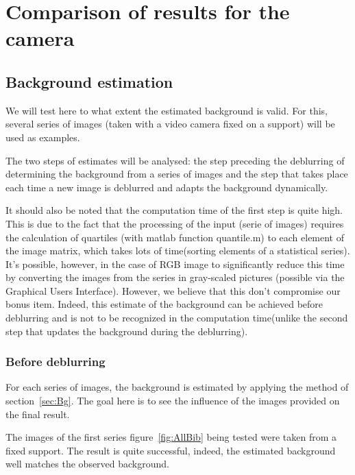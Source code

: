 \section{Comparison of results for the camera}

\subsection{Background estimation}

We will test here to what extent the estimated background is valid. For this, several series of images (taken with a video camera fixed on a support) will be used as examples.

The two steps of estimates will be analysed: the step preceding the deblurring of determining the background from a series of images and the step that takes place each time a new image is deblurred and adapts the background dynamically.

It should also be noted that the computation time of the first step is quite high. This is due to the fact that the processing of the input (serie of images) requires the calculation of quartiles (with matlab  function quantile.m) to each element of the image matrix, which takes lots of time(sorting elements of a statistical series). It's possible, however, in the case of RGB image to significantly reduce this time by converting the images from the series in gray-scaled pictures (possible via the Graphical Users Interface).
However, we believe that this don't compromise our bonus item. Indeed, this estimate of the background can be achieved before deblurring and is not to be recognized in the computation time(unlike the second step that updates the background during the deblurring).

\subsubsection{Before deblurring}

For each series of images, the background is estimated by applying the method of section~\ref{sec:Bg}. The goal here is to see the influence of the images provided on the final result.

The images of the first series figure~\ref{fig:AllBib} being tested were taken from a fixed support. The result is quite successful, indeed, the estimated background well matches the observed background.

